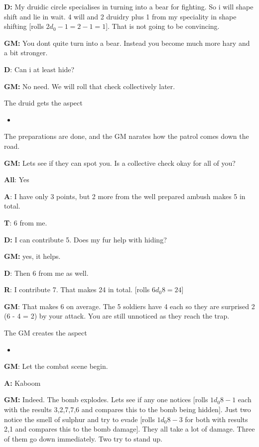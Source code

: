 \documentclass[11pt]{article}
\begin{document}
{\textbf{D:} My druidic circle specialises in turning into a bear for fighting. So i will shape shift and lie in wait. 4 will and 2 druidry plus 1 from my speciality in shape shifting [rolls \(2 d_0 - 1 = 2 - 1 = 1\)]. That is not going to be convincing.

\textbf{GM:} You dont quite turn into a bear. Instead you become much more hary and a bit stronger.

\textbf{D}: Can i at least hide?

\textbf{GM:} No need. We will roll that check collectively later.

The druid gets the aspect
\begin{itemize}
\item {}
\end{itemize}

The preparations are done, and the GM narates how the patrol comes down the road.

\textbf{GM:} Lets see if they can spot you. Is a collective check okay for all of you?

\textbf{All}: Yes

\textbf{A}: I have only 3 points, but 2 more from the well prepared ambush makes 5 in total.

\textbf{T}: 6 from me.

\textbf{D:} I can contribute 5. Does my fur help with hiding?

\textbf{GM:} yes, it helps.

\textbf{D}: Then 6 from me as well.

\textbf{R}: I contribute 7. That makes 24 in total. [rolls \(6 d_0 8 = 24\)]

\textbf{GM}: That makes 6 on average. The 5 soldiers have 4 each so they are surprised 2 (6 - 4 = 2) by your attack. You are still unnoticed as they reach the trap.

The GM creates the aspect
\begin{itemize}
\item {}
\end{itemize}

\textbf{GM}: Let the combat scene begin.

\textbf{A:} Kaboom

\textbf{GM:} Indeed. The bomb explodes. Lets see if any one notices [rolls \(1 d_0 8 - 1\) each with the results 3,2,7,7,6 and compares this to the bomb being hidden]. Just two notice the smell of sulphur and try to evade [rolls \(1 d_0 8 - 3\) for both with results 2,1 and compares this to the bomb damage]. They all take a lot of damage. Three of them go down immediately. Two try to stand up.

}
\end{document}
